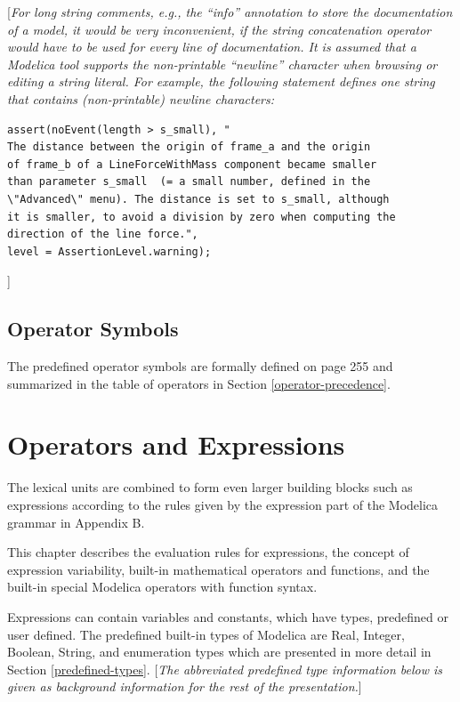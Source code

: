 \documentclass[10pt,a4paper]{report}
\def\Mcomment#1{{[}\emph{#1}{]}}
\def\Mcommentbegin#1{{[}\emph{#1}}
\def\Mcommentend#1{\emph{#1}{]}}
\def\doublelabel#1{\label{#1}\hypertarget{#1}{}}
\begin{document}
\Mcommentbegin{For long string comments, e.g., the ``info'' annotation to store
the documentation of a model, it would be very inconvenient, if the
string concatenation operator would have to be used for every line of
documentation. It is assumed that a Modelica tool supports the
non-printable ``newline'' character when browsing or editing a string
literal. For example, the following statement defines one string that
contains (non-printable) newline characters:}

\begin{lstlisting}[language=modelica]
  assert(noEvent(length > s_small), "
The distance between the origin of frame_a and the origin 
of frame_b of a LineForceWithMass component became smaller 
than parameter s_small  (= a small number, defined in the 
\"Advanced\" menu). The distance is set to s_small, although 
it is smaller, to avoid a division by zero when computing the 
direction of the line force.",
level = AssertionLevel.warning);
\end{lstlisting}
\Mcommentend{}

\section{Operator Symbols}

The predefined operator symbols are formally defined on page 255 and
summarized in the table of operators in Section \ref{operator-precedence}.

\chapter{Operators and Expressions}\doublelabel{operators-and-expressions}

The lexical units are combined to form even larger building blocks such
as expressions according to the rules given by the expression part of
the Modelica grammar in Appendix B.

This chapter describes the evaluation rules for expressions, the concept
of expression variability, built-in mathematical operators and
functions, and the built-in special Modelica operators with function
syntax.

Expressions can contain variables and constants, which have types,
predefined or user defined. The predefined built-in types of Modelica
are Real, Integer, Boolean, String, and enumeration types which are
presented in more detail in Section \ref{predefined-types}. \Mcomment{The abbreviated
predefined type information below is given as background information for
the rest of the presentation.}
\end{document}
